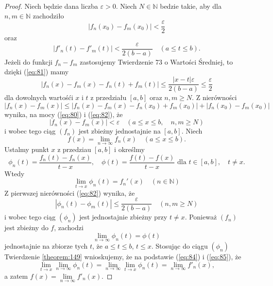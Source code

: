 \documentclass[leqno]{article}
\begin{document}
\begin{justify}
\begin{proof}
    Niech będzie dana liczba $\varepsilon > 0$. Niech $N \in \mathbb{N}$ bedzie takie, aby dla $n,m \in \mathbb{N}$ zachodziło
    \begin{equation}\label{eq:80}
        |f_n(x_0) - f_m(x_0)| < \frac{\varepsilon}{2}
    \end{equation}
    oraz 
    \begin{equation}\label{eq:81}
        |f'_n(t) - f'_m(t)| < \frac{\varepsilon}{2(b-a)} \quad (a \leqslant t \leqslant b).
    \end{equation}
    Jeżeli do funkcji $f_n - f_m$ zastosujemy Twierdzenie 73 o Wartości Średniej, to dzięki (\ref{eq:81}) mamy
    \begin{equation}\label{eq:82}
        |f_n(x) - f_m(x) - f_n(t) + f_m(t)| \leqslant \frac{|x-t|\varepsilon}{2(b-a)} \leqslant \frac{\varepsilon}{2}
    \end{equation}
    dla dowolnych wartośći $x$ i $t$ z przedziału $[a,b]$ oraz $n,m \geqslant N$. Z nierówności
    \[
        |f_n(x) - f_m(x)| \leqslant |f_n(x) - f_m(x) - f_n(x_0) + f_m(x_0)| + |f_n(x_0) - f_m(x_0)|
    \]
    wynika, na mocy (\ref{eq:80}) i (\ref{eq:82}), że 
    \[
        |f_n(x) - f_m(x)| < \varepsilon \quad (a \leqslant x \leqslant b, \quad n,m \geqslant N)
    \]
    i wobec tego ciąg $(f_n)$ jest zbieżny jednostajnie na $[a,b]$. Niech 
    \[
        f(x) = \lim\limits_{n \to \infty}f_n(x) \quad (a \leqslant x \leqslant b).
    \]
    Ustalmy punkt $x$ z przedziau $[a,b]$ i określmy 
    \begin{equation}\label{eq:83}
        \phi_n(t) = \frac{f_n(t) - f_n(x)}{t-x}, \quad \phi(t) = \frac{f(t) - f(x)}{t-x} \text{ dla } t \in [a,b], \quad t \neq x.
    \end{equation}
    Wtedy
    \begin{equation}\label{eq:84}
        \lim\limits_{t \to x}\phi_n(t) = f_n'(x) \quad (n \in \mathbb{N})
    \end{equation}
    Z pierwszej nierówności (\ref{eq:82}) wynika, że 
    \begin{equation*}
        |\phi_n(t) - \phi_m(t)| \leqslant \frac{\varepsilon}{2(b-a)} \quad (n,m \geqslant N)
    \end{equation*}
    i wobec tego ciąg $(\phi_n)$ jest jednostajnie zbieżny przy $t \neq x$. Ponieważ $(f_n)$ jest zbieżny do $f$, zachodzi 
    \begin{equation}\label{eq:85}
        \lim\limits_{n \to \infty}\phi_n(t) = \phi(t)
    \end{equation}
    jednostajnie na zbiorze tych $t$, że $a \leqslant t \leqslant b$, $t \leqslant x$. Stosując do ciągu $(\phi_n)$
    Twierdzenie \ref{theorem:149} wnioskujemy, że na podstawie (\ref{eq:84}) i (\ref{eq:85}), że 
    \[
        \lim\limits_{t \to x} \lim\limits_{n \to \infty}\phi_n(t) = \lim\limits_{n \to \infty}\lim\limits_{t \to x}\phi_n(t) = \lim\limits_{n \to \infty}f'_n(x), 
    \]
    a zatem $f(x) = \lim\limits_{n \to \infty}f'_n(x)$.
\end{proof}


\end{justify}
\end{document}
